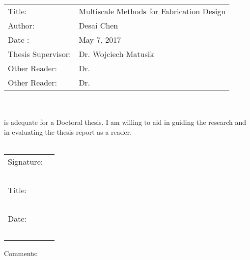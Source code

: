 \documentclass[11pt]{article}
\begin{document}
\begin{tabular}{p{4cm} l}
	Title: & Multiscale Methods for Fabrication Design\\
	Author: & Desai Chen\\
	Date : & May 7, 2017 \\
	Thesis Supervisor: & Dr. Wojciech Matusik\\
	Other Reader: & Dr.\\
	Other Reader: & Dr.
\end{tabular}\\~\\
is adequate for a Doctoral thesis. I am willing to aid in guiding the research and in
evaluating the thesis report as a reader.\\~\\
\begin{flushright}
	\begin{tabular}{l l}
		Signature: & \underline{\hspace{6cm}}\\~\\
		Title: & \underline{\hspace{6cm}}\\~\\
		Date: & \underline{\hspace{6cm}}\\~\\
	\end{tabular}
\end{flushright}
Comments:
\newpage
{}





\end{document}
